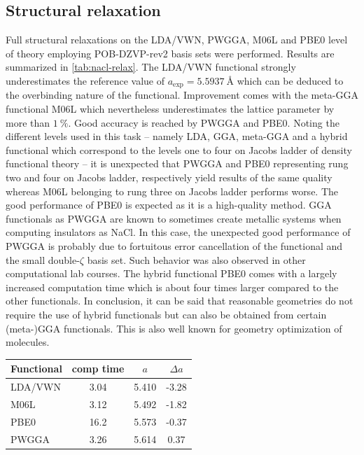 \documentclass[a4paper,12pt,parskip=half]{scrartcl}
\begin{document}
\subsection{Structural relaxation}
%
Full structural relaxations on the LDA/VWN\autocite[]{lda-vwn}, PWGGA\autocite[]{pwgga}, M06L\autocite[]{m06l} and PBE0\autocite[]{pbe0} level of theory employing POB-DZVP-rev2 basis sets\autocite[]{pob-xzvp-rev2} were performed. Results are summarized in \autoref{tab:nacl-relax}. The LDA/VWN functional strongly underestimates the reference value of $ a_\mathrm{exp} = \SI{5.5937}{\angstrom} $ which can be deduced to the overbinding nature of the functional. Improvement comes with the meta-GGA functional M06L which nevertheless underestimates the lattice parameter by more than $ \SI{1}{\percent} $. Good accuracy is reached by PWGGA and PBE0. Noting the different levels used in this task -- namely LDA, GGA, meta-GGA and a hybrid functional which correspond to the levels one to four on Jacobs ladder of density functional theory -- it is unexpected that PWGGA and PBE0 representing rung two and four on Jacobs ladder, respectively yield results of the same quality whereas M06L belonging to rung three on Jacobs ladder performs worse. The good performance of PBE0 is expected as it is a high-quality method. GGA functionals as PWGGA are known to sometimes create metallic systems when computing insulators as NaCl. In this case, the unexpected good performance of PWGGA is probably due to fortuitous error cancellation of the functional and the small double-$ \zeta $ basis set. Such behavior was also observed in other computational lab courses.
The hybrid functional PBE0 comes with a largely increased computation time which is about four times larger compared to the other functionals. In conclusion, it can be said that reasonable geometries do not require the use of hybrid functionals but can also be obtained from certain (meta-)GGA functionals. This is also well known for geometry optimization of molecules.\autocite[]{tpss,r2-scan-3c}

%
\begin{table}
	\centering
	\label{tab:nacl-relax}
	\begin{tabular}{lccc}
		\toprule
		Functional & comp time & $a $  & $ \Delta a $ \\
		\midrule
		LDA/VWN    & 3.04      & 5.410 & -3.28        \\
		M06L       & 3.12      & 5.492 & -1.82        \\
		PBE0       & 16.2      & 5.573 & -0.37        \\
		PWGGA      & 3.26      & 5.614 & 0.37         \\
		\bottomrule
	\end{tabular}
\end{table}
%
\end{document}
